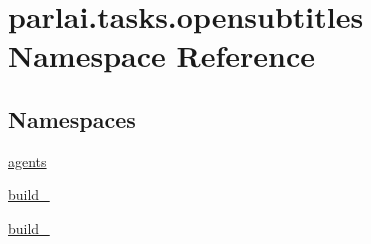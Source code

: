 \hypertarget{namespaceparlai_1_1tasks_1_1opensubtitles}{}\section{parlai.\+tasks.\+opensubtitles Namespace Reference}
\label{namespaceparlai_1_1tasks_1_1opensubtitles}
\subsection*{Namespaces}
\begin{DoxyCompactItemize}
\item 
 \hyperlink{namespaceparlai_1_1tasks_1_1opensubtitles_1_1agents}{agents}
\item 
 \hyperlink{namespaceparlai_1_1tasks_1_1opensubtitles_1_1build__2009}{build\+\_}
\item 
 \hyperlink{namespaceparlai_1_1tasks_1_1opensubtitles_1_1build__2018}{build\+\_}
\end{DoxyCompactItemize}
